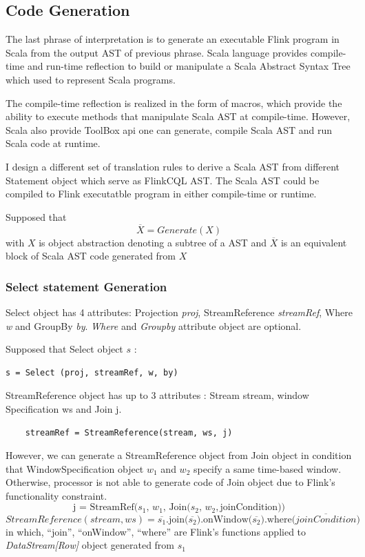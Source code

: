 \subsection{Code Generation}
The last phrase of interpretation is to generate an executable Flink program in Scala from the output AST of previous phrase. Scala language provides compile-time and run-time reflection to build or manipulate a Scala Abstract Syntax Tree which used to represent Scala programs. 

The compile-time reflection is realized in the form of macros, which provide the ability to execute methods that manipulate Scala AST at compile-time. However, Scala also provide ToolBox api one can generate, compile Scala AST and run Scala code at runtime. 

I design a different set of translation rules to derive a Scala AST from different Statement object which serve as FlinkCQL AST. The Scala AST could be compiled to Flink executatble program in either compile-time or runtime.

Supposed that 
\begin{equation}
	\overline{X} = Generate(X)
\end{equation}
 with $X$ is object abstraction denoting a subtree of a AST and $\overline{X}$ is an equivalent block of Scala AST code generated from $X$

\subsubsection*{Select statement Generation}
Select object has 4 attributes: Projection \textit{proj}, StreamReference \textit{streamRef}, Where \textit{w} and GroupBy \textit{by}. \textit{Where} and \textit{Groupby} attribute object are optional. 

Supposed that Select object $s$ :
\begin{lstlisting}
s = Select (proj, streamRef, w, by)
\end{lstlisting}

StreamReference object has up to 3 attributes :  Stream stream, window Specification ws and Join j.
\begin{lstlisting}
	streamRef = StreamReference(stream, ws, j)
\end{lstlisting}

However, we can generate a StreamReference object from Join object in condition that WindowSpecification object $w_1$ and $w_2$ specify a same time-based window. Otherwise, processor is not able to generate code of Join object due to Flink's functionality constraint.
\begin{equation}
	\textrm{j = StreamRef(}s_1,\, w_1,\, \textrm{Join(}s_2,\, w_2, \textrm{joinCondition))}
\end{equation}
\begin{equation}
StreamReference(stream, ws) = \overline{  s_1}\textrm{.join(}\overline{s_2})\textrm{.onWindow(}\overline{s_2}\textrm{).where(}\overline{joinCondition}\textrm{)}
\end{equation}
in which, ``join'', ``onWindow'', ``where'' are Flink's functions applied to  \textit{DataStream[Row]} object generated from $s_1$


